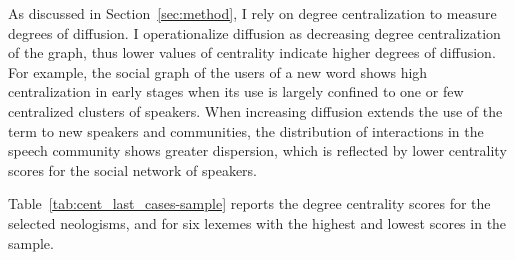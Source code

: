 \documentclass[
  a4paper,
  abstract=on,
  captions=tableabove
  ]{scrartcl}
\begin{document}
      As discussed in Section~\ref{sec:method}, I rely on degree centralization to measure degrees of diffusion. I operationalize diffusion as decreasing degree centralization of the graph, thus lower values of centrality indicate higher degrees of diffusion. For example, the social graph of the users of a new word shows high centralization in early stages when its use is largely confined to one or few centralized clusters of speakers. When increasing diffusion extends the use of the term to new speakers and communities, the distribution of interactions in the speech community shows greater dispersion, which is reflected by lower centrality scores for the social network of speakers.

      Table~\ref{tab:cent_last_cases-sample} reports the degree centrality scores for the selected neologisms, and for six lexemes with the highest and lowest scores in the sample.
\end{document}
